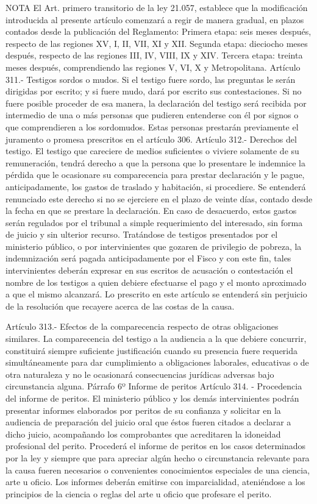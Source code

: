 NOTA
      El Art. primero transitorio de la ley 21.057, establece que la modificación introducida al presente artículo comenzará a regir de manera gradual, en plazos contados desde la publicación del Reglamento: Primera etapa: seis meses después, respecto de las regiones XV, I, II, VII, XI y XII.  Segunda etapa: dieciocho meses después, respecto de las regiones III, IV, VIII, IX y XIV.  Tercera etapa:  treinta meses después, comprendiendo las regiones V, VI, X y Metropolitana.
    Artículo 311.- Testigos sordos o mudos. Si el testigo fuere sordo, las preguntas le serán dirigidas por escrito; y si fuere mudo, dará por escrito sus contestaciones.
    Si no fuere posible proceder de esa manera, la declaración del testigo será recibida por intermedio de una o más personas que pudieren entenderse con él por signos o que comprendieren a los sordomudos. Estas personas prestarán previamente el juramento o promesa prescritos en el artículo 306.
    Artículo 312.- Derechos del testigo. El testigo que careciere de medios suficientes o viviere solamente de su remuneración, tendrá derecho a que la persona que lo presentare le indemnice la pérdida que le ocasionare su comparecencia para prestar declaración y le pague, anticipadamente, los gastos de traslado y habitación, si procediere.
    Se entenderá renunciado este derecho si no se ejerciere en el plazo de veinte días, contado desde la fecha en que se prestare la declaración.
    En caso de desacuerdo, estos gastos serán regulados por el tribunal a simple requerimiento del interesado, sin forma de juicio y sin ulterior recurso.
    Tratándose de testigos presentados por el ministerio público, o por intervinientes que gozaren de privilegio de pobreza, la indemnización será pagada anticipadamente por el Fisco y con este fin, tales intervinientes deberán expresar en sus escritos de acusación o contestación el nombre de los testigos a quien debiere efectuarse el pago y el monto aproximado a que el mismo alcanzará.
    Lo prescrito en este artículo se entenderá sin perjuicio de la resolución que recayere acerca de las costas de la causa.

    Artículo 313.- Efectos de la comparecencia respecto de otras obligaciones similares. La comparecencia del testigo a la audiencia a la que debiere concurrir, constituirá siempre suficiente justificación cuando su presencia fuere requerida simultáneamente para dar cumplimiento a obligaciones laborales, educativas o de otra naturaleza y no le ocasionará consecuencias jurídicas adversas bajo circunstancia alguna.
    Párrafo 6º Informe de peritos
    Artículo 314. - Procedencia del informe de peritos. El ministerio público y los demás intervinientes podrán presentar informes elaborados por peritos de su confianza y solicitar en la audiencia de preparación del juicio oral que éstos fueren citados a declarar a dicho juicio, acompañando los comprobantes que acreditaren la idoneidad profesional del perito.
    Procederá el informe de peritos en los casos determinados por la ley y siempre que para apreciar algún hecho o circunstancia relevante para la causa fueren necesarios o convenientes conocimientos especiales de una ciencia, arte u oficio.
    Los informes deberán emitirse con imparcialidad, ateniéndose a los principios de la ciencia o reglas del arte u oficio que profesare el perito.

